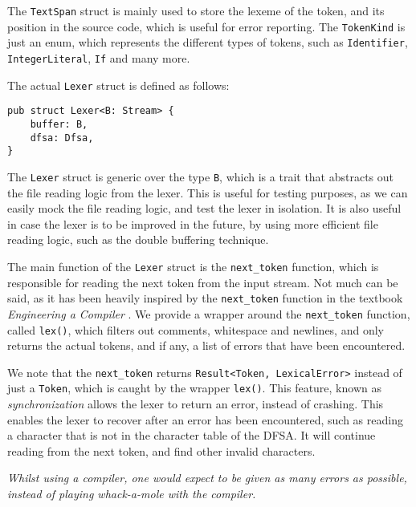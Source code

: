 \documentclass{article}
\newcommand{\code}[1]{\texttt{#1}}
\begin{document}
The \code{TextSpan} struct is mainly used to store the lexeme of the token, and
its position in the source code, which is useful for error reporting. The
\code{TokenKind} is just an enum, which represents the different types of tokens, such as \code{Identifier},
\code{IntegerLiteral}, \code{If} and many more.


The actual \code{Lexer} struct is defined as follows:

\begin{mainbox}{}
    \lstset{belowskip=0pt, aboveskip=0pt}
    \begin{lstlisting}[caption={The \code{Lexer} struct.}]
pub struct Lexer<B: Stream> {
    buffer: B,
    dfsa: Dfsa,
}
    \end{lstlisting}
\end{mainbox}

The \code{Lexer} struct is generic over the type \code{B}, which is a trait that
abstracts out the file reading logic from the lexer. This is useful for testing
purposes, as we can easily mock the file reading logic, and test the lexer in
isolation. It is also useful in case the lexer is to be improved in the future,
by using more efficient file reading logic, such as the double buffering
technique.

The main function of the \code{Lexer} struct is the \code{next\_token} function,
which is responsible for reading the next token from the input stream. Not much
can be said, as it has been heavily inspired by the \code{next\_token} function
in the textbook \textit{Engineering a Compiler} \cite{engineering-a-compiler}.
We provide a wrapper around the \code{next\_token} function, called
\code{lex()}, which filters out comments, whitespace and newlines, and only
returns the actual tokens, and if any, a list of errors that have been
encountered.


We note that the \code{next\_token} returns \code{Result<Token, LexicalError>}
instead of just a \code{Token}, which is caught by the wrapper \code{lex()}.
This feature, known as \textit{synchronization} allows the lexer to return an
error, instead of crashing. This enables the lexer to recover after an error has
been encountered, such as reading a character that is not in the character table
of the DFSA. It will continue reading from the next token, and find other
invalid characters.

\begin{center}
    \textit{Whilst using a compiler, one would expect to
        be given as many errors as possible, instead of
        playing whack-a-mole with the compiler.}
\end{center}
\end{document}
